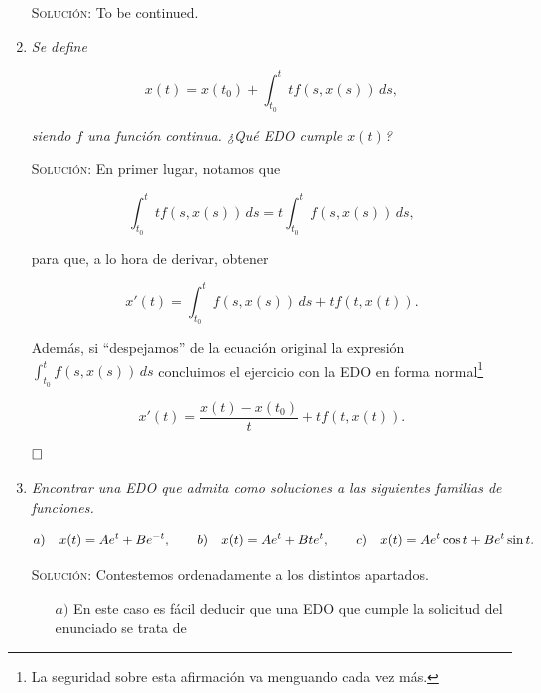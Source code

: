 \documentclass{article}
\begin{document}
\begin{enumerate}
    \vspace{7px}

    \textsc{Solución:} To be continued.

    \vspace{12px}

    \item \textit{Se define}
    
    \[x(t) = x(t_0) + \int_{t_0}^{t} tf(s, x(s))\, ds,\]

    \textit{siendo $f$ una función continua. ¿Qué EDO cumple $x(t)$?}

    \vspace{7px}

    \textsc{Solución:} En primer lugar, notamos que

    \[\int_{t_0}^{t} tf(s, x(s))\, ds = t \int_{t_0}^{t} f(s, x(s))\, ds,\]

    para que, a lo hora de derivar, obtener

    \[x'(t) = \int_{t_0}^{t} f(s, x(s))\, ds + tf(t, x(t)).\]

    Además, si ``despejamos'' de la ecuación original la expresión $\int_{t_0}^{t} f(s, x(s))\, ds$ concluimos el ejercicio con la EDO en forma normal\footnote{La seguridad sobre esta afirmación va menguando cada vez más.}

    \[x'(t) = \frac{x(t) - x(t_0)}{t} + tf(t, x(t)).\]

    $\hfill\square$

    \newpage

    \item \textit{Encontrar una EDO que admita como soluciones a las siguientes familias de funciones.}

    \[a) \hspace{10px} x(t) = Ae^t + Be^{-t}, \hspace{20px} b) \hspace{10px} x(t) = Ae^t + Bte^t, \hspace{20px} c) \hspace{10px} x(t) = Ae^t\cos t + Be^t\sin t.\]

    \vspace{7px}

    \textsc{Solución:} Contestemos ordenadamente a los distintos apartados.

    \begin{itemize}
        \item[$a)$] En este caso es fácil deducir que una EDO que cumple la solicitud del enunciado se trata de
        

\end{itemize}
\end{enumerate}
\end{document}
